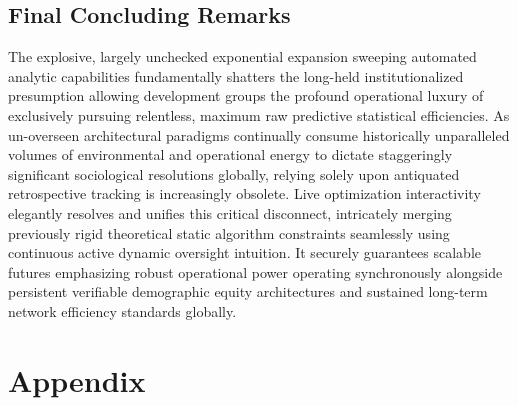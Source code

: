 \documentclass[12pt,a4paper]{article}
\begin{document}
\subsection{Final Concluding Remarks}
The explosive, largely unchecked exponential expansion sweeping automated analytic capabilities fundamentally shatters the long-held institutionalized presumption allowing development groups the profound operational luxury of exclusively pursuing relentless, maximum raw predictive statistical efficiencies. As un-overseen architectural paradigms continually consume historically unparalleled volumes of environmental and operational energy to dictate staggeringly significant sociological resolutions globally, relying solely upon antiquated retrospective tracking is increasingly obsolete. Live optimization interactivity elegantly resolves and unifies this critical disconnect, intricately merging previously rigid theoretical static algorithm constraints seamlessly using continuous active dynamic oversight intuition. It securely guarantees scalable futures emphasizing robust operational power operating synchronously alongside persistent verifiable demographic equity architectures and sustained long-term network efficiency standards globally.

\newpage
\section{Appendix}
\end{document}
